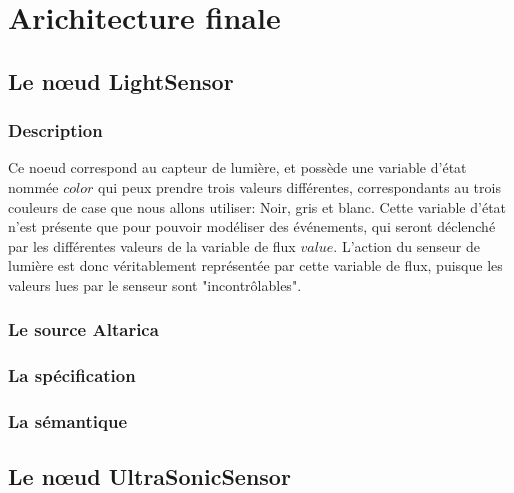 \section{Arichitecture finale}

  \subsection{Le n\oe{}ud LightSensor}

   \subsubsection{Description}
   Ce noeud correspond au capteur de lumière, et possède une variable
   d'état nommée $color$ qui   peux prendre trois valeurs différentes,
   correspondants au trois couleurs de case que nous allons utiliser:
   Noir, gris et blanc. Cette variable d'état n'est présente que pour
   pouvoir modéliser des événements, qui seront déclenché par les
   différentes valeurs de la variable de flux $value$. L'action du
   senseur de lumière est donc véritablement représentée par cette
   variable de flux, puisque les valeurs lues par le senseur sont
   "incontrôlables".

   \subsubsection{Le source Altarica}
   
   
   \subsubsection{La spécification}
   

   \subsubsection{La sémantique}
   
  \subsection{Le n\oe{}ud UltraSonicSensor}
  
